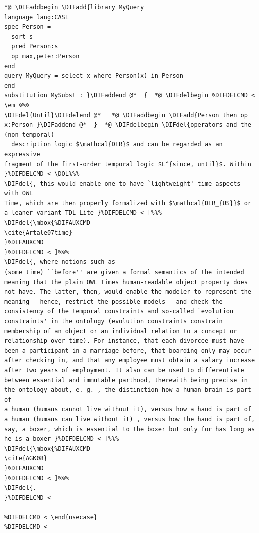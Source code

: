 \documentclass[10pt,fleqn,final]{scrreprt}
\newcommand*{\DOL}{\ensuremath{\mathsf{DOL}}\xspace}
\providecommand{\DIFadd}[1]{{\protect\color{blue}\uwave{#1}}} %
\providecommand{\DIFdel}[1]{{\protect\color{red}\sout{#1}}}                      %
\providecommand{\DIFaddbegin}{} %
\providecommand{\DIFaddend}{} %
\providecommand{\DIFdelbegin}{} %
\providecommand{\DIFdelend}{} %
\begin{document}
\begin{lstlisting}[basicstyle=\ttfamily,language=dolText,alsolanguage=CASL,escapechar=@,mathescape]
%DIF > prefix( lang:  <http://purl.net/DOL/languages/> )%
*@ \DIFaddbegin \DIFadd{library MyQuery
language lang:CASL
spec Person =
  sort s
  pred Person:s 
  op max,peter:Person
end
query MyQuery = select x where Person(x) in Person
end
substitution MySubst : }\DIFaddend @*  {  *@ \DIFdelbegin %DIFDELCMD < \em %%%
\DIFdel{Until}\DIFdelend @*   *@ \DIFaddbegin \DIFadd{Person then op x:Person }\DIFaddend @*  }  *@ \DIFdelbegin \DIFdel{operators and the (non-temporal)
  description logic $\mathcal{DLR}$ and can be regarded as an expressive
fragment of the first-order temporal logic $L^{since, until}$. Within
}%DIFDELCMD < \DOL%%%
\DIFdel{, this would enable one to have `lightweight' time aspects with OWL
Time, which are then properly formalized with $\mathcal{DLR_{US}}$ or
a leaner variant TDL-Lite }%DIFDELCMD < [%%%
\DIFdel{\mbox{%DIFAUXCMD
\cite{Artale07time}
}%DIFAUXCMD
}%DIFDELCMD < ]%%%
\DIFdel{, where notions such as
(some time) ``before'' are given a formal semantics of the intended
meaning that the plain OWL Times human-readable object property does
not have. The latter, then, would enable the modeler to represent the
meaning --hence, restrict the possible models-- and check the
consistency of the temporal constraints and so-called `evolution
constraints' in the ontology (evolution constraints constrain
membership of an object or an individual relation to a concept or
relationship over time). For instance, that each divorcee must have
been a participant in a marriage before, that boarding only may occur
after checking in, and that any employee must obtain a salary increase
after two years of employment. It also can be used to differentiate
between essential and immutable parthood, therewith being precise in
the ontology about, e. g. , the distinction how a human brain is part of
a human (humans cannot live without it), versus how a hand is part of
a human (humans can live without it) , versus how the hand is part of,
say, a boxer, which is essential to the boxer but only for has long as
he is a boxer }%DIFDELCMD < [%%%
\DIFdel{\mbox{%DIFAUXCMD
\cite{AGK08}
}%DIFAUXCMD
}%DIFDELCMD < ]%%%
\DIFdel{.
}%DIFDELCMD < 

%DIFDELCMD < \end{usecase}
%DIFDELCMD < 


\end{lstlisting}
\end{document}
